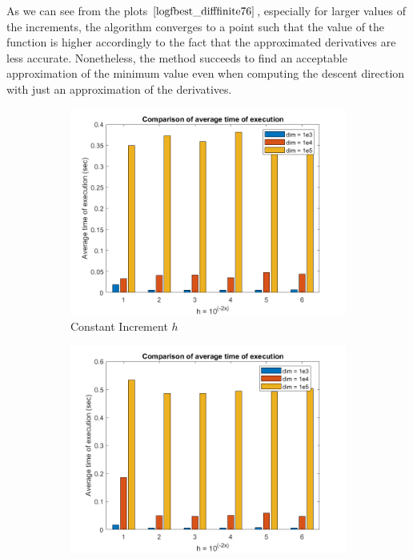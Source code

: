 As we can see from the plots $\eqref{logfbest_difffinite76}$, especially for larger values of the increments, the algorithm converges to a point such that the value of the function is higher accordingly to the fact that the approximated derivatives are less accurate. Nonetheless, the method succeeds to find an acceptable approximation of the minimum value even when computing the descent direction with just an approximation of the derivatives.

\begin{figure}[htbp]
    \centering
    \begin{subfigure}[t]{0.45\textwidth}  %
        \centering
        \includegraphics[width=\textwidth]{img/pb76_MN_difffinite_COST_timeofexec.png}
        \caption{Constant Increment $h$}
    \end{subfigure}
    \hspace{1cm} %
    \begin{subfigure}[t]{0.45\textwidth}
        \centering
        \includegraphics[width=\textwidth]{img/pb76_MN_difffinite_REL_timeofexec.png}

\end{subfigure}
\end{figure}
